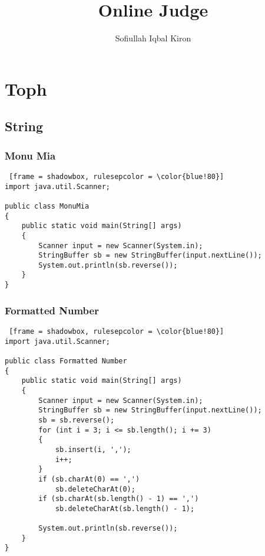 \documentclass[11 pt]{book}
\title{Online Judge}
\author
{
	Sofiullah Iqbal Kiron
}
\begin{document}
\maketitle %

\chapter{Toph}

\section{String}

\subsection{Monu Mia}
\begin{lstlisting} [frame = shadowbox, rulesepcolor = \color{blue!80}]
import java.util.Scanner;

public class MonuMia
{
    public static void main(String[] args)
    {
        Scanner input = new Scanner(System.in);
        StringBuffer sb = new StringBuffer(input.nextLine());
        System.out.println(sb.reverse());
    }
}
\end{lstlisting}

\subsection{Formatted Number}
\begin{lstlisting} [frame = shadowbox, rulesepcolor = \color{blue!80}]
import java.util.Scanner;

public class Formatted Number
{
    public static void main(String[] args)
    {
        Scanner input = new Scanner(System.in);
        StringBuffer sb = new StringBuffer(input.nextLine());
        sb = sb.reverse();
        for (int i = 3; i <= sb.length(); i += 3)
        {
            sb.insert(i, ',');
            i++;
        }
        if (sb.charAt(0) == ',')
            sb.deleteCharAt(0);
        if (sb.charAt(sb.length() - 1) == ',')
            sb.deleteCharAt(sb.length() - 1);

        System.out.println(sb.reverse());
    }
}
\end{lstlisting}
\end{document}
